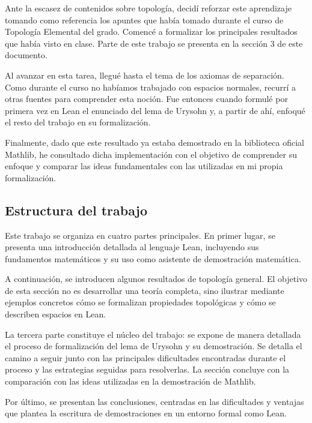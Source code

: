 Ante la escasez de contenidos sobre topología, decidí reforzar este aprendizaje tomando como referencia los apuntes que había tomado durante el curso de Topología Elemental del grado. Comencé a formalizar los principales resultados que había visto en clase. Parte de este trabajo se presenta en la sección 3 de este documento.

Al avanzar en esta tarea, llegué hasta el tema de los axiomas de separación. Como durante el curso no habíamos trabajado con espacios normales, recurrí a otras fuentes para comprender esta noción. Fue entonces cuando formulé por primera vez en Lean el enunciado del lema de Urysohn y, a partir de ahí, enfoqué el resto del trabajo en su formalización.

Finalmente, dado que este resultado ya estaba demostrado en la biblioteca oficial Mathlib, he consultado dicha implementación con el objetivo de comprender su enfoque y comparar las ideas fundamentales con las utilizadas en mi propia formalización.

\subsection{Estructura del trabajo}

Este trabajo se organiza en cuatro partes principales. En primer lugar, se presenta una introducción detallada al lenguaje Lean, incluyendo sus fundamentos matemáticos y su uso como asistente de demostración matemática.

A continuación, se introducen algunos resultados de topología general. El objetivo de esta sección no es desarrollar una teoría completa, sino ilustrar mediante ejemplos concretos cómo se formalizan propiedades topológicas y cómo se describen espacios en Lean.

La tercera parte constituye el núcleo del trabajo: se expone de manera detallada el proceso de formalización del lema de Urysohn y su demostración. Se detalla el camino a seguir junto con las principales dificultades encontradas durante el proceso y las estrategias seguidas para resolverlas. La sección concluye con la comparación con las ideas utilizadas en la demostración de Mathlib.

Por último, se presentan las conclusiones, centradas en las dificultades y ventajas que plantea la escritura de demostraciones en un entorno formal como Lean.